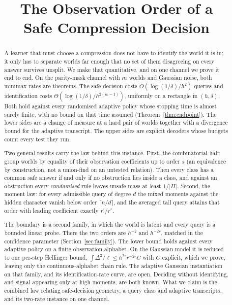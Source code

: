 



\title{The Observation Order of a\\Safe Compression Decision}

\author{
}

\maketitle

\begin{abstract}
A learner that must choose a compression does not have to identify the world it is in; it
only has to separate worlds far enough that no set of them disagreeing on every answer
survives unsplit. We make that quantitative, and on one channel we prove it end to end. On
the parity-mask channel with $m$ worlds and Gaussian noise, both minimax rates are
theorems. The safe decision costs $\Theta(\log(1/\delta)/h^{2})$ queries and identification
costs $\Theta(\log(1/\delta)/h^{2(m-1)})$, uniformly on a rectangle in $(h,\delta)$. Both hold
against every randomised adaptive policy whose stopping time is almost surely finite, with no
bound on that time assumed (Theorem~\ref{thm:endpoint}). The lower sides are a change of
measure at a hard pair of worlds together with a divergence bound for the adaptive
transcript. The upper sides are explicit decoders whose budgets count every test they run.

Two general results carry the law behind this instance. First, the combinatorial half:
group worlds by equality of their observation coefficients up to order $s$ (an equivalence
by construction, not a union-find on an untested relation). Then every class has a common
safe answer if and only if no obstruction lies inside a class, and against an obstruction
every \emph{randomised} rule leaves unsafe mass at least $1/|H|$. Second, the moment law: for
every admissible query of degree $d$ the mixed moments against the hidden character vanish
below order $\lceil n/d\rceil$, and the averaged tail query attains that order with leading
coefficient exactly $r!/r^{r}$.

The boundary is a second family, in which the world is latent and every query is a bounded
linear probe. There the two orders are $h^{-2}$ and $h^{-2r}$, matched in the confidence
parameter (Section~\ref{sec:family}). The lower bound holds against every adaptive policy on
a finite observation alphabet. On the Gaussian model it is reduced to one per-step Hellinger
bound, $\int\Delta^{2}/\ell\le h^{2r}r^{-2r}C$ with $C$ explicit, which we prove, leaving only
the continuous-alphabet chain rule. The adaptive Gaussian instantiation on that family, and
its identification-rate curve, are open. Deciding without identifying, and signal appearing
only at high moments, are both known. What we claim is the combined law relating
safe-decision geometry, a query class and adaptive transcripts, and its two-rate instance on
one channel.
\end{abstract}

